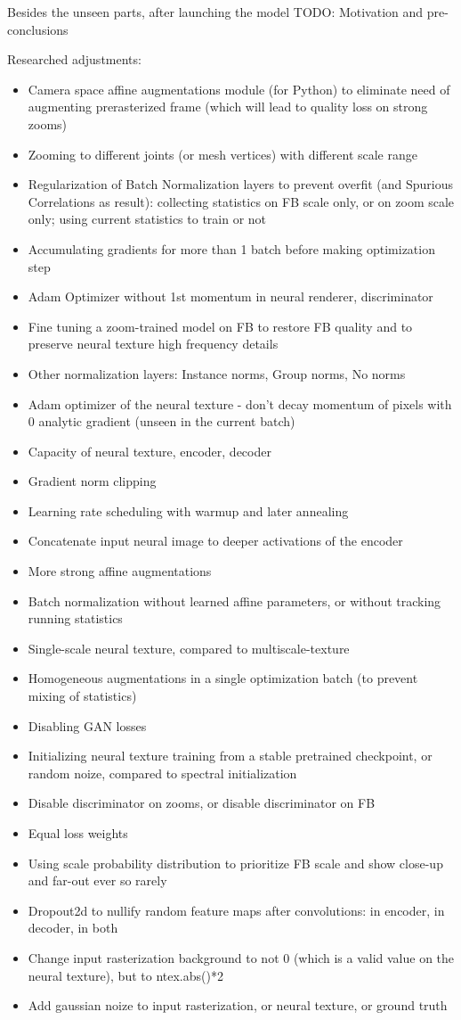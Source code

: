 Besides the unseen parts, after launching the model
\alert{TODO: Motivation and pre-conclusions}

Researched adjustments:
\begin{itemize}
	\item Camera space affine augmentations module (for Python) to eliminate need of augmenting prerasterized frame (which will lead to quality loss on strong zooms)
	\item Zooming to different joints (or mesh vertices) with different scale range 
	\item Regularization of Batch Normalization layers to prevent overfit (and Spurious Correlations as result): collecting statistics on FB scale only, or on zoom scale only; using current statistics to train or not
	\item Accumulating gradients for more than 1 batch before making optimization step
	\item Adam Optimizer without 1st momentum in neural renderer, discriminator
	\item Fine tuning a zoom-trained model on FB to restore FB quality and to preserve neural texture high frequency details
	\item Other normalization layers: Instance norms, Group norms, No norms
	\item Adam optimizer of the neural texture - don't decay momentum of pixels with 0 analytic gradient (unseen in the current batch)
	\item Capacity of neural texture, encoder, decoder
	\item Gradient norm clipping
	\item Learning rate scheduling with warmup and later annealing
	\item Concatenate input neural image to deeper activations of the encoder
	\item More strong affine augmentations 
	\item Batch normalization without learned affine parameters, or without tracking running statistics 
	\item Single-scale neural texture, compared to multiscale-texture
	\item Homogeneous augmentations in a single optimization batch (to prevent mixing of statistics)
	\item Disabling GAN losses
	\item Initializing neural texture training from a stable pretrained checkpoint, or random noize, compared to spectral initialization
	\item Disable discriminator on zooms, or disable discriminator on FB
	\item Equal loss weights
	\item Using scale probability distribution to prioritize FB scale and show close-up and far-out ever so rarely
	\item Dropout2d to nullify random feature maps after convolutions: in encoder, in decoder, in both
	\item Change input rasterization background to not 0 (which is a valid value on the neural texture), but to ntex.abs()*2
	\item Add gaussian noize to input rasterization, or neural texture, or ground truth
	
\end{itemize}